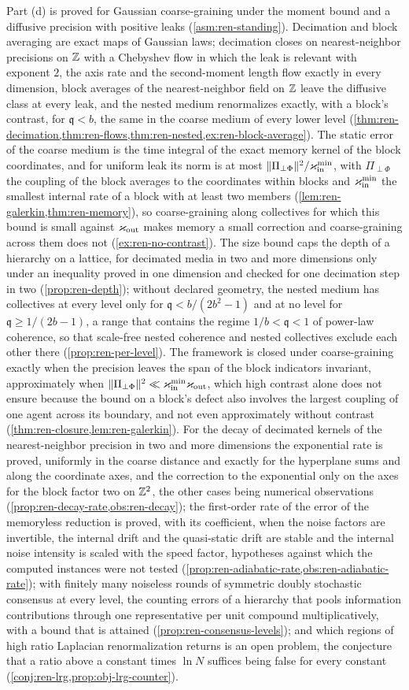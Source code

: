 Part (d) is proved for Gaussian coarse-graining under the moment bound and a diffusive precision with positive leaks (\cref{asm:ren-standing}). Decimation and block averaging are exact maps of Gaussian laws; decimation closes on nearest-neighbor precisions on $\mathbb{Z}$ with a Chebyshev flow in which the leak is relevant with exponent $2$, the axis rate and the second-moment length flow exactly in every dimension, block averages of the nearest-neighbor field on $\mathbb{Z}$ leave the diffusive class at every leak, and the nested medium renormalizes exactly, with a block's contrast, for $\mathfrak q<b$, the same in the coarse medium of every lower level (\cref{thm:ren-decimation,thm:ren-flows,thm:ren-nested,ex:ren-block-average}). The static error of the coarse medium is the time integral of the exact memory kernel of the block coordinates, and for uniform leak its norm is at most $\Vert\Pi_{\perp\Phi}\Vert^2/\varkappa_{\mathrm{in}}^{\min}$, with $\Pi_{\perp\Phi}$ the coupling of the block averages to the coordinates within blocks and $\varkappa_{\mathrm{in}}^{\min}$ the smallest internal rate of a block with at least two members (\cref{lem:ren-galerkin,thm:ren-memory}), so coarse-graining along collectives for which this bound is small against $\varkappa_{\mathrm{out}}$ makes memory a small correction and coarse-graining across them does not (\cref{ex:ren-no-contrast}). The size bound caps the depth of a hierarchy on a lattice, for decimated media in two and more dimensions only under an inequality proved in one dimension and checked for one decimation step in two (\cref{prop:ren-depth}); without declared geometry, the nested medium has collectives at every level only for $\mathfrak q<b/(2b^2-1)$ and at no level for $\mathfrak q\ge1/(2b-1)$, a range that contains the regime $1/b<\mathfrak q<1$ of power-law coherence, so that scale-free nested coherence and nested collectives exclude each other there (\cref{prop:ren-per-level}). The framework is closed under coarse-graining exactly when the precision leaves the span of the block indicators invariant, approximately when $\Vert\Pi_{\perp\Phi}\Vert^2\ll\varkappa_{\mathrm{in}}^{\min}\varkappa_{\mathrm{out}}$, which high contrast alone does not ensure because the bound on a block's defect also involves the largest coupling of one agent across its boundary, and not even approximately without contrast (\cref{thm:ren-closure,lem:ren-galerkin}). For the decay of decimated kernels of the nearest-neighbor precision in two and more dimensions the exponential rate is proved, uniformly in the coarse distance and exactly for the hyperplane sums and along the coordinate axes, and the correction to the exponential only on the axes for the block factor two on $\mathbb{Z}^2$, the other cases being numerical observations (\cref{prop:ren-decay-rate,obs:ren-decay}); the first-order rate of the error of the memoryless reduction is proved, with its coefficient, when the noise factors are invertible, the internal drift and the quasi-static drift are stable and the internal noise intensity is scaled with the speed factor, hypotheses against which the computed instances were not tested (\cref{prop:ren-adiabatic-rate,obs:ren-adiabatic-rate}); with finitely many noiseless rounds of symmetric doubly stochastic consensus at every level, the counting errors of a hierarchy that pools information contributions through one representative per unit compound multiplicatively, with a bound that is attained (\cref{prop:ren-consensus-levels}); and which regions of high ratio Laplacian renormalization returns is an open problem, the conjecture that a ratio above a constant times $\ln N$ suffices being false for every constant (\cref{conj:ren-lrg,prop:obj-lrg-counter}).
